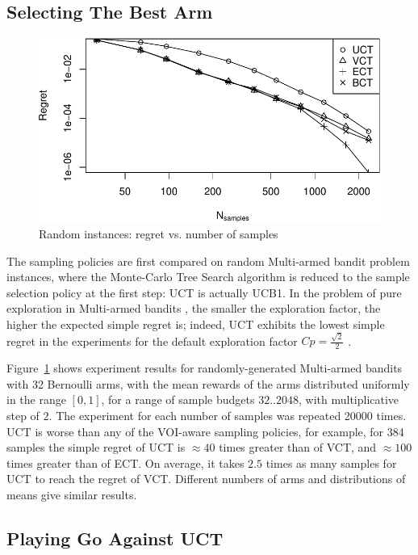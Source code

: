 \documentclass{article}
\begin{document}
\subsection{Selecting The Best Arm}
\label{sec:emp-arm}

\begin{figure}[t]
\centering
\includegraphics[scale=0.8]{flat.pdf}
\caption{Random instances: regret vs. number of samples}
\label{fig:random-instances}
\end{figure}

The sampling policies are first compared on random Multi-armed bandit 
problem instances, where the Monte-Carlo Tree Search algorithm
is reduced to the sample selection policy at the first step: UCT is 
actually UCB1. In the problem of pure exploration in Multi-armed bandits
\cite{Bubeck.pure}, the smaller the exploration factor, the higher
the expected simple regret is; indeed, UCT exhibits the lowest simple
regret in the experiments for the default exploration factor $Cp=\frac
{\sqrt 2} 2$ \cite{Kocsis.uct}.

Figure~\ref{fig:random-instances} shows experiment results for
randomly-generated Multi-armed bandits with 32 Bernoulli arms, with
the mean rewards of the arms distributed uniformly in the range $[0,
  1]$, for a range of sample budgets $32..2048$, with multiplicative
step of $2$. The experiment for each number of samples was repeated
20000 times. UCT is worse than any of the VOI-aware sampling policies,
for example, for 384 samples the simple regret of UCT is $\approx 40$
times greater than of VCT, and $\approx 100$ times greater than of
ECT. On average, it takes $2.5$ times as many samples for UCT to reach
the regret of VCT. Different numbers of arms and distributions of
means give similar results.

\subsection{Playing Go Against UCT}
\label{sec:emp-go}
\end{document}
